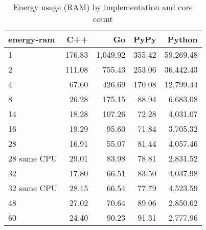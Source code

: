 \begin{table}
    \centering
    \begin{tabular}{lrrrr}
        \hline
        energy-ram      & C++       & Go        & PyPy      & Python      \\
        \hline
        1               &   176.83  & 1,049.92  &   355.42  &  59,269.48  \\
        2               &   111.08  &   755.43  &   253.06  &  36,442.43  \\
        4               &    67.60  &   426.69  &   170.08  &  12,799.44  \\
        8	              &    26.28 	&   175.15  &    88.94  &	  6,683.08  \\
        14              &    18.28  &   107.26  &    72.28  &   4,031.07  \\
        16              &    19.29  &    95.60  &    71.84  &   3,705.32  \\
        28              &    16.91  &    55.07  &    81.44  &   4,057.46  \\
        28 same CPU     &    29.01  &    83.98  &    78.81  &   2,831.52  \\
        32              &    17.80  &    66.51  &    83.50  &   4,037.98  \\
        32 same CPU     &    28.15  &    66.54  &    77.79  &   4,523.59  \\
        48              &    27.02  &    70.64  &    89.06  &   2,850.62  \\
        60              &    24.40  &    90.23  &    91.31  &   2,777.96  \\
        \hline
    \end{tabular}
    \caption{Energy usage (RAM) by implementation and core count}
    \label{tab:server-energy-ram}
\end{table}